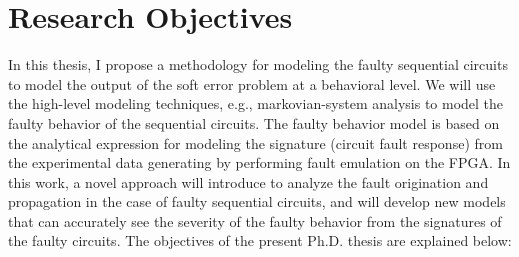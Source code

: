 \section{Research Objectives}



In this thesis, I propose a methodology for modeling the faulty sequential circuits to model the output of the soft error problem at a behavioral level. We will use the high-level modeling techniques, e.g., markovian-system analysis to model the faulty behavior of the sequential circuits. The faulty behavior model is based on the analytical expression for modeling the signature (circuit fault response) from the experimental data generating by performing fault emulation on the FPGA. In this work, a novel approach will introduce to analyze the fault origination and propagation in the case of faulty sequential circuits, and will develop new models that can accurately see the severity of the faulty behavior from the signatures of the faulty circuits. The objectives of the present Ph.D. thesis are explained below: 

